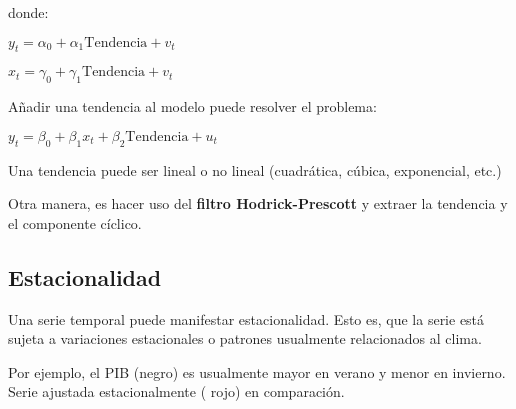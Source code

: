 \documentclass[10pt, a4paper, landscape]{article}
\begin{document}
\begin{multicols}{3}
		donde:
		
		\begin{center}
			$y_{t} = \alpha_{0} + \alpha_{1} \mathrm{Tendencia}+ v_{t}$
			
			$x_{t} = \gamma_{0} + \gamma_{1} \mathrm{Tendencia}+ v_{t}$
		\end{center}
		
		Añadir una tendencia al modelo puede resolver el problema:
		
		\begin{center}
			$y_{t} = \beta_{0} + \beta_{1} x_{t} + \beta_{2} \mathrm{Tendencia}+ u_{t}$
		\end{center}
		
		Una tendencia puede ser lineal o no lineal (cuadrática, cúbica, exponencial, etc.)
		
		Otra manera, es hacer uso del \textbf{filtro Hodrick-Prescott} y extraer la tendencia y el componente cíclico.
		
		\subsection*{Estacionalidad}
		
		\setlength{\multicolsep}{0pt}
		\begin{multicols}{2}
			Una serie temporal puede manifestar estacionalidad. Esto es, que la serie está sujeta a variaciones estacionales o patrones usualmente relacionados al clima.
			
			Por ejemplo, el PIB (negro) es usualmente mayor en verano y menor en invierno. Serie ajustada estacionalmente ({\color{red} rojo}) en comparación.
			
			\columnbreak
			

\end{multicols}
\end{multicols}
\end{document}
